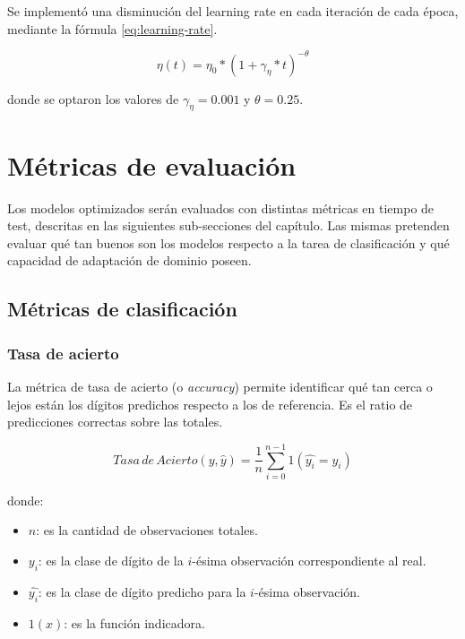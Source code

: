 Se implementó una disminución del learning rate en cada iteración de cada época, mediante la fórmula
\ref{eq:learning-rate}.

\begin{equation}
    \eta(t) = \eta_0 * (1 + \gamma_{\eta} * t)^{-\theta}
    \label{eq:learning-rate}
\end{equation}

\noindent
donde se optaron los valores de $\gamma_{\eta}=0.001$ y $\theta = 0.25$.

\section{Métricas de evaluación}

Los modelos optimizados serán evaluados con distintas métricas en tiempo de test, descritas en las siguientes
sub-secciones del capítulo. Las mismas pretenden evaluar qué tan buenos son los modelos respecto a la tarea de
clasificación y qué capacidad de adaptación de dominio poseen.

\subsection{Métricas de clasificación}
\subsubsection{Tasa de acierto}

La métrica de tasa de acierto (o {\it accuracy}) permite identificar qué tan cerca o lejos están los dígitos predichos
respecto a los de referencia. Es el ratio de predicciones correctas sobre las totales.

\begin{equation}
    Tasa \, de \, Acierto(y, \hat{y}) = \frac{1}{n} \sum_{i=0}^{n-1} 1(\hat{y_{i}}=y_{i})
\end{equation}

\noindent
donde:
\begin{itemize}
    \item $n$: es la cantidad de observaciones totales.
    \item $y_{i}$: es la clase de dígito de la ${i}$-ésima observación correspondiente al real.
    \item $\hat{y_{i}}$: es la clase de dígito predicho para la ${i}$-ésima observación.
    \item $1(x)$: es la función indicadora.
\end{itemize}

